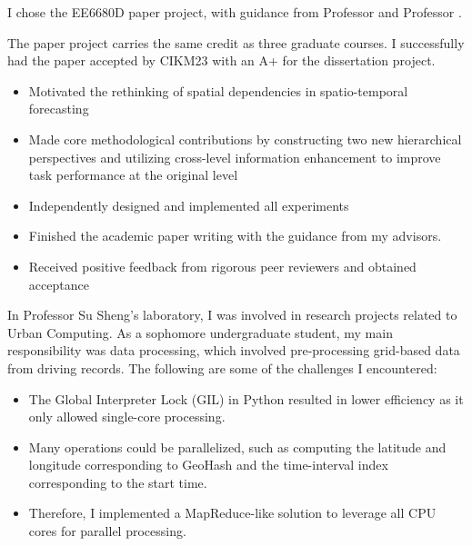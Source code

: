 \documentclass{resume}
\begin{document}
I chose the EE6680D paper project, with guidance from Professor \href{https://www.cityu.edu.hk/stfprofile/haoliali.htm}{\color{blue}{Haoliang Li}} and Professor \href{https://www.cityu.edu.hk/stfprofile/xyzhao.htm}{\color{blue}{Xiangyu Zhao}}.

The paper project carries the same credit as three graduate courses. I successfully had the paper accepted by CIKM23 with an A+ for the dissertation project.
\psi 
\begin{itemize}
\item Motivated the rethinking of spatial dependencies in spatio-temporal forecasting
\item Made core methodological contributions by constructing two new hierarchical perspectives and utilizing cross-level information enhancement to improve task performance at the original level
\item Independently designed and implemented all experiments
\item Finished the academic paper writing with the guidance from my advisors. 
\item Received positive feedback from rigorous peer reviewers and obtained acceptance
\end{itemize}

In Professor Su Sheng's laboratory, I was involved in research projects related to Urban Computing.
As a sophomore undergraduate student, my main responsibility was data processing, which involved pre-processing grid-based data from driving records.
The following are some of the challenges I encountered:
\begin{itemize}
\item The Global Interpreter Lock (GIL) in Python resulted in lower efficiency as it only allowed single-core processing.
\item Many operations could be parallelized, such as computing the latitude and longitude corresponding to GeoHash and the time-interval index corresponding to the start time.
\item Therefore, I implemented a MapReduce-like solution to leverage all CPU cores for parallel processing.
\end{itemize}
\end{document}

